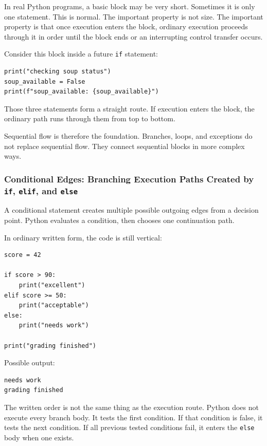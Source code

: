 In real Python programs, a basic block may be very short. Sometimes it is only one statement. This is normal. The important property is not size. The important property is that once execution enters the block, ordinary execution proceeds through it in order until the block ends or an interrupting control transfer occurs.

Consider this block inside a future \texttt{if} statement:

\begin{verbatim}
print("checking soup status")
soup_available = False
print(f"soup_available: {soup_available}")
\end{verbatim}

Those three statements form a straight route. If execution enters the block, the ordinary path runs through them from top to bottom.

Sequential flow is therefore the foundation. Branches, loops, and exceptions do not replace sequential flow. They connect sequential blocks in more complex ways.

\subsubsection{Conditional Edges: Branching Execution Paths Created by \texttt{if}, \texttt{elif}, and \texttt{else}}

A conditional statement creates multiple possible outgoing edges from a decision point. Python evaluates a condition, then chooses one continuation path.

In ordinary written form, the code is still vertical:

\begin{verbatim}
score = 42

if score > 90:
    print("excellent")
elif score >= 50:
    print("acceptable")
else:
    print("needs work")

print("grading finished")
\end{verbatim}

Possible output:

\begin{verbatim}
needs work
grading finished
\end{verbatim}

The written order is not the same thing as the execution route. Python does not execute every branch body. It tests the first condition. If that condition is false, it tests the next condition. If all previous tested conditions fail, it enters the \texttt{else} body when one exists.

